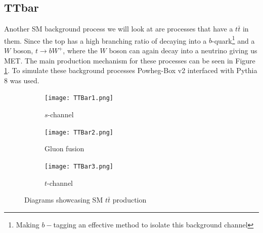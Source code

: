 \documentclass[12pt, a4paper]{book}
\begin{document}
\subsection{TTbar}
Another SM background process we will look at are processes that have a $t\bar{t}$ in them. Since the top has a high branching ratio of decaying into a $b$-quark\footnote{Making $b-$tagging an effective method to isolate this background channel} and a $W$ boson, $t\rightarrow bW^+$, where the $W$ boson can again decay into a neutrino giving 
us MET. The main production mechanism for these processes can be seen in Figure \ref{fig:TT_BKG}. To simulate these background processes Powheg-Box v2 \cite{PowHeg} interfaced with Pythia 8 \cite{Pythia} was used.
\begin{figure}[!ht]
    \centering
    \begin{subfigure}[b]{0.3\textwidth}
        \centering
        \texttt{[image: TTBar1.png]}
        \caption{$s$-channel}
    \end{subfigure}
    \hfill
    \begin{subfigure}[b]{0.3\textwidth}
        \centering
        \texttt{[image: TTBar2.png]}
        \caption{Gluon fusion}
    \end{subfigure}
    \hfill
    \begin{subfigure}[b]{0.3\textwidth}
        \centering
        \texttt{[image: TTBar3.png]}
        \caption{$t$-channel}
    \end{subfigure}
    \caption[$t\bar{t}$ production]{Diagrams showcasing SM $t\bar{t}$ production}\label{fig:TT_BKG}
\end{figure}
\end{document}

